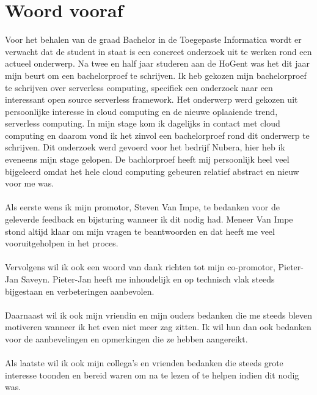 
\chapter*{Woord vooraf}
\label{ch:voorwoord}

Voor het behalen van de graad Bachelor in de Toegepaste Informatica wordt er verwacht dat de student in staat is een concreet onderzoek uit te werken rond een actueel onderwerp. Na twee en half jaar studeren aan de HoGent was het dit jaar mijn beurt om een bachelorproef te schrijven. Ik heb gekozen mijn bachelorproef te schrijven over serverless computing, specifiek een onderzoek naar een interessant open source serverless framework. Het onderwerp werd gekozen uit persoonlijke interesse in cloud computing en de nieuwe oplaaiende trend, serverless computing. In mijn stage kom ik dagelijks in contact met cloud computing en daarom vond ik het zinvol een bachelorproef rond dit onderwerp te schrijven. Dit onderzoek werd gevoerd voor het bedrijf Nubera, hier heb ik eveneens mijn stage gelopen. De bachlorproef heeft mij persoonlijk heel veel bijgeleerd omdat het hele cloud computing gebeuren relatief abstract en nieuw voor me was. 
\\\\
Als eerste wens ik mijn promotor, Steven Van Impe, te bedanken voor de geleverde feedback en bijsturing wanneer ik dit nodig had. Meneer Van Impe stond altijd klaar om mijn vragen te beantwoorden en dat heeft me veel vooruitgeholpen in het proces.
\\\\
Vervolgens wil ik ook een woord van dank richten tot mijn co-promotor, Pieter-Jan Saveyn. Pieter-Jan heeft me inhoudelijk en op technisch vlak steeds bijgestaan en verbeteringen aanbevolen.
\\\\
Daarnaast wil ik ook mijn vriendin en mijn ouders bedanken die me steeds bleven motiveren wanneer ik het even niet meer zag zitten. Ik wil hun dan ook bedanken voor de aanbevelingen en opmerkingen die ze hebben aangereikt.
\\\\
Als laatste wil ik ook mijn collega's en vrienden bedanken die steeds grote interesse toonden en bereid waren om na te lezen of te helpen indien dit nodig was.
